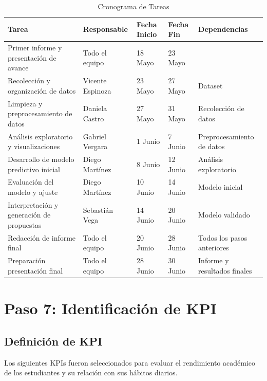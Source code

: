 \documentclass[12pt,letterpaper]{report}
\begin{document}
\begin{table}[H]
    \centering
    \begin{tabularx}{\textwidth}{|X|X|X|X|X|}
        \hline
        \textbf{Tarea} & \textbf{Responsable} & \textbf{Fecha Inicio} & \textbf{Fecha Fin} & \textbf{Dependencias} \\
        \hline  Primer informe y presentación de avance
        & Todo el equipo & 18 Mayo & 23 Mayo& \\
        \hline Recolección y organización de datos 
        & Vicente Espinoza & 23 Mayo & 27 Mayo& Dataset\\
        \hline Limpieza y preprocesamiento de datos
        & Daniela Castro & 	27 Mayo & 31 Mayo & Recolección de datos \\
        \hline Análisis exploratorio y visualizaciones
        & Gabriel Vergara & 1 Junio & 7 Junio & Preprocesamiento de datos \\
        \hline Desarrollo de modelo predictivo inicial
        & Diego Martínez & 8 Junio & 12 Junio&Análisis exploratorio\\
        \hline Evaluación del modelo y ajuste
        & Diego Martínez & 10 Junio & 14 Junio &  Modelo inicial\\
        \hline Interpretación y generación de propuestas
        & Sebastián Vega & 14 Junio & 20 Junio & Modelo validado\\
        \hline Redacción de informe final
        & Todo el equipo & 20 Junio & 28 Junio& Todos los pasos anteriores\\
        \hline Preparación presentación final
        & Todo el equipo & 28 Junio & 30 Junio& Informe y resultados finales \\
        \hline
    \end{tabularx}
    \caption{Cronograma de Tareas}
\end{table}

\section{Paso 7: Identificación de KPI}

\subsection{Definición de KPI}
Los siguientes KPIs fueron seleccionados para evaluar el rendimiento académico de los estudiantes y su relación con sus hábitos diarios.
\end{document}
